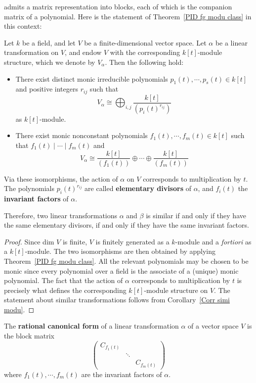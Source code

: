 admits a matrix representation into blocks, each of which is the companion matrix of a polynomial. Here is the statement of Theorem~\ref{PID fg modu class} in this context:
\begin{theorem}\label{Lin tran decomp}
Let $k$ be a field, and let $V$ be a finite-dimensional vector space. Let $\alpha$ be a linear transformation on $V$, and endow $V$ with the corresponding $k[t]$-module structure, which we denote by $V_\alpha$. Then the following hold:
\begin{itemize}
\item There exist distinct monic irreducible polynomials $p_1(t),\cdots,p_s(t)\in k[t]$ and
positive integers $r_{ij}$ such that
\[V_\alpha\cong \bigoplus_{i,j}\dfrac{k[t]}{(p_i(t)^{r_{ij}})}\]
as $k[t]$-module.
\item There exist monic nonconstant polynomials $f_1(t),\cdots,f_m(t)\in k[t]$ such that $f_1(t)\mid\cdots\mid f_m(t)$ and
\[V_\alpha\cong\dfrac{k[t]}{(f_1(t))}\oplus\cdots\oplus\dfrac{k[t]}{(f_m(t))}\]
\end{itemize}
Via these isomorphisms, the action of $\alpha$ on $V$ corresponds to multiplication by $t$. The polynomials $p_i(t)^{r_{ij}}$ are called \textbf{elementary divisors} of $\alpha$, and $f_i(t)$ the \textbf{invariant factors} of $\alpha$.\par
Therefore, two linear transformations $\alpha$ and $\beta$ is similar if and only if they have the same elementary divisors, if and only if they have the same invariant factors.
\end{theorem}
\begin{proof}
Since dim $V$ is finite, $V$ is finitely generated as a $k$-module and a \textit{fortiori} as a $k[t]$-module. The two isomorphisms are then obtained by applying Theorem~\ref{PID fg modu class}.
All the relevant polynomials may be chosen to be monic since every polynomial over a field is the associate of a (unique) monic polynomial. The fact that the action of $\alpha$ corresponds to multiplication by $t$ is precisely what defines the corresponding $k[t]$-module structure on $V$. The statement about similar transformations follows from Corollary~\ref{Corr simi modu}.
\end{proof}
\begin{definition}
The \textbf{rational canonical form} of a linear transformation $\alpha$ of a vector space $V$ is the block matrix
\[\begin{pmatrix}
C_{f_1(t)}&&\\
&\ddots&\\
&&C_{f_m(t)}
\end{pmatrix}\]
where $f_1(t),\cdots,f_m(t)$ are the invariant factors of $\alpha$.
\end{definition}
